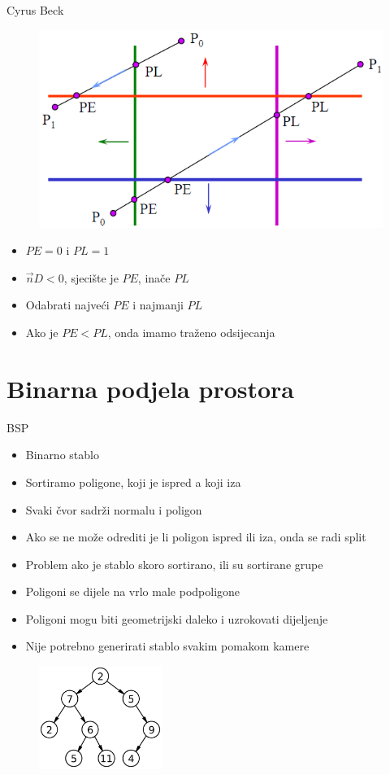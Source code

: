 \documentclass[9pt]{beamer}
\begin{document}
\begin{frame}{Cyrus Beck}
	\begin{figure}
		\centering
		\includegraphics[width=0.7\linewidth]{slike/cyrus_beck02.png}
	\end{figure}
	\begin{itemize}
		\item $PE=0$ i $PL=1$
		\item $\vec{n}D < 0$, sjecište je $PE$, inače $PL$
		\item Odabrati najveći $PE$ i najmanji $PL$
		\item Ako je $PE<PL$, onda imamo traženo odsijecanja  
	\end{itemize}
\end{frame}
\section{Binarna podjela prostora}

\begin{frame}{BSP}
	\begin{itemize}
		\item Binarno stablo
		\item Sortiramo poligone, koji je ispred a koji iza
		\item Svaki čvor sadrži normalu i poligon
		\item Ako se ne može odrediti je li poligon ispred ili iza, onda se radi split
		\item Problem ako je stablo skoro sortirano, ili su sortirane grupe
		\item Poligoni se dijele na vrlo male podpoligone
		\item Poligoni mogu biti geometrijski daleko i uzrokovati dijeljenje
		\item Nije potrebno generirati stablo svakim pomakom kamere
	\end{itemize}
	\begin{figure}
		\centering
		\includegraphics[width=4cm]{slike/binary_tree.png}
	\end{figure}
\end{frame}
\end{document}
